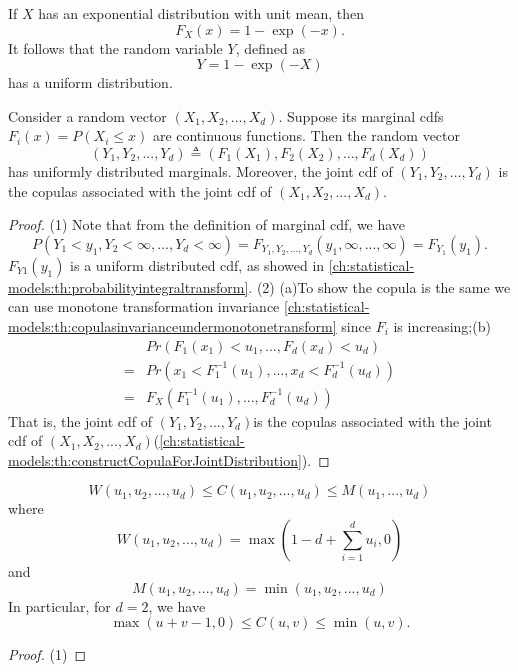 \begin{refsection}
\begin{example}
If $X$ has an exponential distribution with unit mean, then 
$$F_X(x) = 1 - \exp(-x).$$
It follows that the random variable $Y$, defined as
$$Y = 1 - \exp(-X)$$
has a uniform distribution.
\end{example}


\begin{lemma}\label{ch:statistical-models:th:ProbababilityTransformForRandomVectorAndProperties}
	Consider a random vector $(X_1,X_2,...,X_d)$. Suppose its marginal cdfs $F_i(x) = P(X_i\leq x)$ are continuous functions. Then the random vector
	$$(Y_1,Y_2,...,Y_d) \triangleq (F_1(X_1),F_2(X_2),...,F_d(X_d))$$
	has uniformly distributed marginals. 
	Moreover, the joint cdf of $(Y_1,Y_2,...,Y_d)$ is the copulas associated with the joint cdf of $(X_1,X_2,...,X_d)$.  
\end{lemma}
\begin{proof}
(1)	Note that from the definition of marginal cdf, we have
	$$P(Y_1 < y_1,Y_2 < \infty, ...,Y_d < \infty) = F_{Y_1,Y_2,...,Y_d}(y_1,\infty,...,\infty) = F_{Y_1}(y_1).$$
	$F_{Y1}(y_1)$ is a uniform distributed cdf, as showed in \autoref{ch:statistical-models:th:probabilityintegraltransform}.
(2)	(a)To show the copula is the same we can use monotone transformation invariance \autoref{ch:statistical-models:th:copulasinvarianceundermonotonetransform} since $F_i$ is increasing;(b) 
\begin{align*}
&Pr(F_1(x_1) < u_1 ,...,F_d(x_d)<u_d) \\
=&Pr(x_1 < F_1^{-1}(u_1),...,x_d < F_d^{-1}(u_d)) \\
=&F_X(F_1^{-1}(u_1),...,F_d^{-1}(u_d))
\end{align*}
That is, the joint cdf of $(Y_1,Y_2,...,Y_d)$is the copulas associated with the joint cdf of $(X_1,X_2,...,X_d)$(\autoref{ch:statistical-models:th:constructCopulaForJointDistribution}).
\end{proof}

\begin{lemma}\label{ch:statistical-models:th:FrechetHoeffdingBounding}\cite[189]{mcneil2015quantitative}
	$$W(u_1,u_2,...,u_d)\leq C(u_1,u_2,...,u_d) \leq M(u_1,...,u_d)$$
	where
	$$W(u_1,u_2,...,u_d) = \max(1 - d + \sum_{i=1}^du_i,0)$$
	and
	$$M(u_1,u_2,...,u_d) = \min(u_1,u_2,...,u_d)$$
	In particular, for $d=2$, we have
	$$\max(u+v-1,0) \leq C(u,v) \leq \min(u,v).$$
\end{lemma}
\begin{proof}
(1) 


\end{proof}
\end{refsection}

